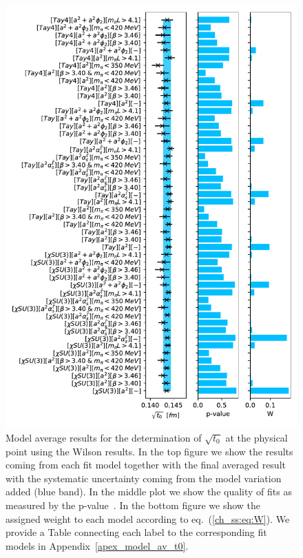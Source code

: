 \begin{figure}
    \centering
    \includegraphics[width=1.\textwidth]{./cap5/figs/BMA_w.pdf}
    \caption{Model average results for the determination of $\sqrt{t_0}$ at the physical point using the Wilson results. In the top figure we show the results coming from each fit model together with the final averaged result with the systematic uncertainty coming from the model variation added (blue band). In the middle plot we show the quality of fits as measured by the p-value~\cite{chi_exp}. In the bottom figure we show the assigned weight to each model according to eq.~(\ref{ch_ss:eq:W}). We provide a Table connecting each label to the corresponding fit models in Appendix~\ref{apex_model_av_t0}.}
    \label{ch_ss:fig:BMA_w}
\end{figure}

